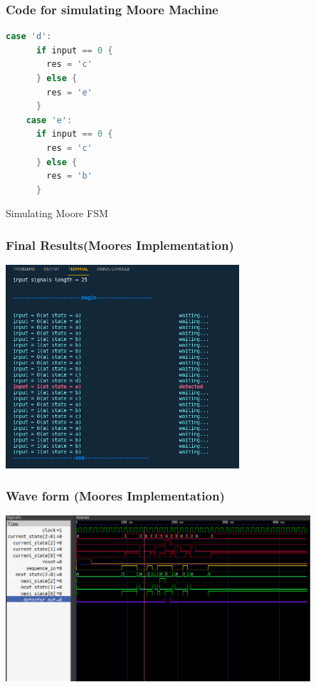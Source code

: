 \documentclass[xcolor=table]{beamer}
\begin{document}
\begin{frame}[fragile]
  \frametitle{Code for simulating Moore Machine}
\begin{lstlisting}[language=go,keywordstyle=\bf,stringstyle=\it]
    case 'd':
      if input == 0 {
        res = 'c'
      } else {
        res = 'e'
      }
    case 'e':
      if input == 0 {
        res = 'c'
      } else {
        res = 'b'
      }
  \end{lstlisting}
\end{frame}

\begin{frame}{Simulating Moore FSM}
\end{frame}

\begin{frame}
  \frametitle{Final Results(Moores Implementation)}
  \centering
  \includegraphics[width=0.65\textwidth, height=0.85\textheight]{./static/sim_res_moore.png}
\end{frame}

\begin{frame}
  \frametitle{Wave form (Moores Implementation)}
  \centering
  \includegraphics[width=0.85\textwidth, height=0.65\textheight]{./static/res_wave_moore.png}
\end{frame}
\end{document}
